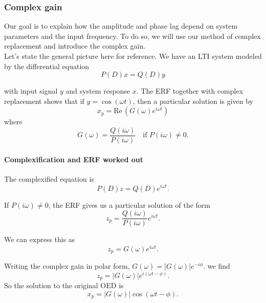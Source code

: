 \clearpage

\subsubsection{Complex gain}

Our goal is to explain how the amplitude and phase lag depend on system parameters and the input frequency.
To do so, we will use our method of complex replacement and introduce the complex gain.\\

Let's state the general picture here for reference.
We have an LTI system modeled by the differential equation
\begin{equation*}
  P(D)x = Q(D)y 
\end{equation*}

with input signal $y$ and system response $x$.
The ERF together with complex replacement shows that if $y = \cos (\omega t)$,
then a particular solution is given by
\begin{equation*}
  x_ p  = \mathrm{Re\, } \left( G(\omega) e^{i \omega t}\right)
\end{equation*}
where
\begin{equation*}
  \displaystyle G(\omega)
  \displaystyle = \displaystyle \frac{Q(i \omega)}{P(i \omega)} \quad
  \text{if } P(i \omega) \neq 0. 
\end{equation*}

\paragraph{Complexification and ERF worked out}
The complexified equation is
\begin{equation*}
  P(D)z = Q(D) e^{i \omega t}. 
\end{equation*}

If $P(i \omega) \neq 0$, the ERF gives us a particular solution of the form
\begin{equation*}
  \displaystyle z_ p
  \displaystyle = \frac{Q(i \omega)}{P(i \omega)} e^{i \omega t}. 
\end{equation*}

We can express this as
\begin{equation*}
  \displaystyle z_ p = G(\omega) e^{i \omega t}.
\end{equation*}

Writing the complex gain in polar form, $G(\omega) = |G(\omega)| e^{-i \phi}$. we find
\begin{equation*}
  z_ p =\left|G(\omega )\right| e^{i(\omega t-\phi )}.
\end{equation*}
So the solution to the original OED is
\begin{equation*}
  x_ p =\left|G(\omega )\right| \cos {(\omega t-\phi )}.
\end{equation*}

